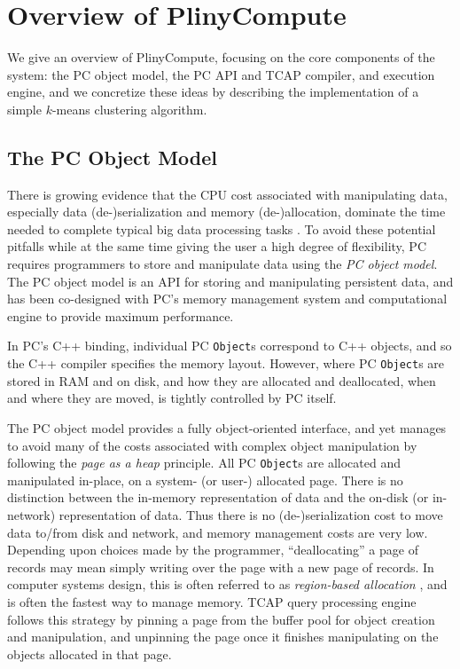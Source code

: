 
\section{Overview of PlinyCompute}

We give an overview of PlinyCompute, focusing on the core components of the
system: the PC object model, 
the PC API and TCAP compiler, and execution engine, and we concretize these ideas by
describing the implementation of a simple $k$-means clustering algorithm.

\subsection{The PC Object Model}

There is growing evidence that the CPU cost associated with manipulating data, especially data (de-)serialization and memory 
(de-)allocation,  
dominate the time needed to complete typical big data processing tasks
\cite{ousterhout2015making, shi2015clash}.
To avoid these potential pitfalls while at the same time giving the user a high degree of flexibility,
PC requires programmers to store and manipulate data using the \emph{PC object model}.
The PC object model is an API for storing and manipulating persistent
data, and has been co-designed with PC's memory management system and computational engine to provide
maximum performance.  

In PC's C++ binding, individual PC \texttt{Object}s correspond to C++ objects, and so the C++ compiler specifies the memory layout.
However, where PC \texttt{Object}s are stored in RAM and on disk, and how they are allocated and deallocated, when and where they are moved, is
tightly controlled by PC itself.

The PC object model provides a fully object-oriented interface, and yet manages to avoid many of the costs associated with complex object manipulation
by following the \emph{page as a heap} principle.  
All PC \texttt{Object}s are allocated and manipulated in-place, on a system-
(or user-) allocated page.  There is
no distinction between the in-memory representation of data and the on-disk (or in-network) representation of
data. Thus there is no (de-)serialization cost to move data to/from disk and network, and memory management costs are very low. Depending upon choices made by the
programmer, ``deallocating'' a page of records
may mean simply writing over the page with a new page of records.  
In computer systems design, this is often referred to as
\emph{region-based allocation} \cite{tofte1997region,
  grossman2002region}, and is often the fastest way to manage
memory. 
TCAP query processing engine follows this strategy by pinning a page from the buffer
pool for object creation and manipulation, and unpinning the page once
it finishes manipulating on the objects allocated in that page.

